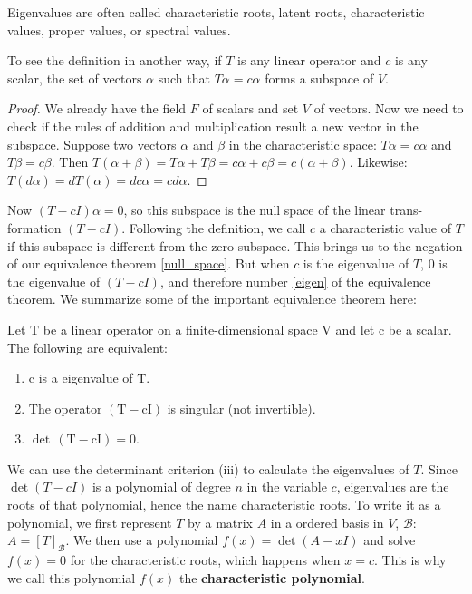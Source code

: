 \documentclass[main.tex]{subfiles}
\begin{document}
Eigenvalues are often called characteristic roots, latent roots, characteristic values, proper values, or spectral values. 

To see the definition in another way, if $T$ is any linear operator and $c$ is any scalar, the set of vectors $\alpha$ such that $T \alpha=c \alpha$ forms a subspace of $V$. 

\begin{proof}
    We already have the field $F$ of scalars and set $V$ of vectors. Now we need to check if the rules of addition and multiplication result a new vector in the subspace. Suppose two vectors $\alpha$ and $\beta$ in the characteristic space: $T\alpha = c\alpha$ and $T\beta = c\beta$. Then $T(\alpha + \beta) = T\alpha + T\beta = c\alpha + c\beta = c(\alpha + \beta)$. Likewise: $T(d\alpha) = d T(\alpha) = dc\alpha = cd\alpha$. 
\end{proof}
Now $(T - cI)\alpha = 0$, so this subspace is the null space of the linear trans-formation $(T-c I)$. Following the definition, we call $c$ a characteristic value of $T$ if this subspace is different from the zero subspace. This brings us to the negation of our equivalence theorem \ref{null_space}. But when $c$ is the eigenvalue of $T$, $0$ is the eigenvalue of $(T - cI)$, and therefore number \ref{eigen} of the equivalence theorem. We summarize some of the important equivalence theorem here: 
\begin{theorem}
    Let $\mathrm{T}$ be a linear operator on a finite-dimensional space $\mathrm{V}$ and let $\mathrm{c}$ be a scalar. The following are equivalent:
    \begin{enumerate}[1.]
        \item $\mathrm{c}$ is a eigenvalue of $\mathrm{T}$.
        \item The operator $\mathrm{(T - cI)}$ is singular (not invertible).
        \item $\operatorname{det} \,(\mathrm{T}-\mathrm{cI})=0$.
    \end{enumerate}
\end{theorem}

We can use the determinant criterion (iii) to calculate the eigenvalues of $T$. Since $\det (T-c I)$ is a polynomial of degree $n$ in the variable $c$, eigenvalues are the roots of that polynomial, hence the name characteristic roots. To write it as a polynomial, we first represent $T$ by a matrix $A$ in a ordered basis in $V$, $\mathcal{B}$: $A = [T]_\mathcal{B}$. We then use a polynomial $f(x) = \det (A - xI)$ and solve $f(x) = 0$ for the characteristic roots, which happens when $x = c$. This is why we call this polynomial $f(x)$ the \textbf{characteristic polynomial}.
\end{document}
